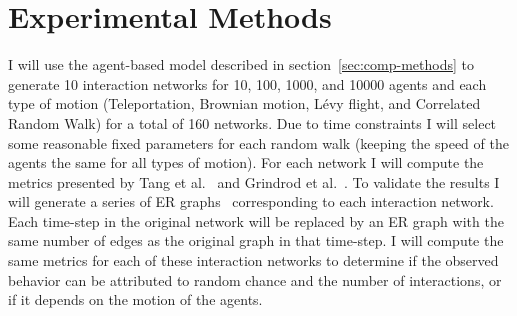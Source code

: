 \documentclass{article}
\begin{document}
\section{Experimental Methods}
I will use the agent-based model described in
section~\ref{sec:comp-methods} to generate 10 interaction networks for
10, 100, 1000, and 10000 agents and each type of motion
(Teleportation, Brownian motion, L{\'e}vy flight, and Correlated
Random Walk) for a total of 160 networks. Due to time constraints I
will select some reasonable fixed parameters for each random walk
(keeping the speed of the agents the same for all types of
motion). For each network I will compute the metrics presented by Tang
et al.~\cite{Tang2010} and Grindrod et al.~\cite{Grindrod2011}. To
validate the results I will generate a series of ER
graphs~\cite{Erdos1960} corresponding to each interaction network.
Each time-step in the original network will be replaced by an ER graph
with the same number of edges as the original graph in that
time-step. I will compute the same metrics for each of these
interaction networks to determine if the observed behavior can be
attributed to random chance and the number of interactions, or if it
depends on the motion of the agents.



\end{document}
